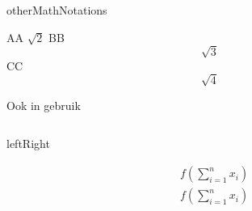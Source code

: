 \documentclass[../presentatie.tex]{subfiles}
\begin{document}
\begin{saveblock}{otherMathNotations}
	\begin{highlightblock}[gobble=8,linewidth=0.5\textwidth,
		framexleftmargin=0.25em,xleftmargin=0.25em]
		AA \(\sqrt{2}\)
		BB \[\sqrt{3}\]
		CC $$ \sqrt{4} $$
	\end{highlightblock}
\end{saveblock}

\addtorecentlist{\textbackslash [ \textellipsis\textbackslash]}

\begin{frame}{Ook in gebruik}
	\begin{columns}
		\begin{column}{0.5\textwidth}
		\end{column}
		\begin{column}{0.5\textwidth}
		\end{column}
	\end{columns}


\end{frame}


\begin{saveblock}{leftRight}
	\begin{highlightblock}[gobble=8,linewidth=\textwidth,framexleftmargin=0.25em]
		\begin{align*}
			&f(\sum_{i=1}^{n}x_i)\\
			&f\left(\sum_{i=1}^{n}x_i\right)
		\end{align*}
	\end{highlightblock}
\end{saveblock}
\end{document}
